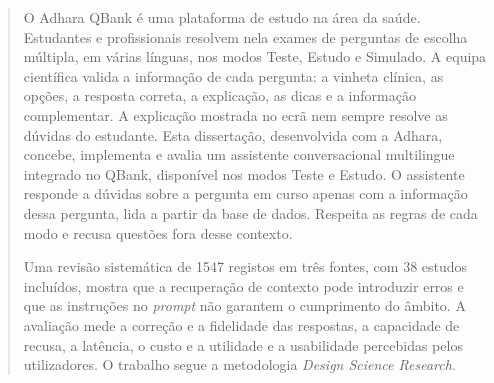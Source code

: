 \begin{abstract}



O Adhara QBank é uma plataforma de estudo na área da saúde. Estudantes e profissionais resolvem nela exames de perguntas de escolha múltipla, em várias línguas, nos modos Teste, Estudo e Simulado. A equipa científica valida a informação de cada pergunta: a vinheta clínica, as opções, a resposta correta, a explicação, as dicas e a informação complementar. A explicação mostrada no ecrã nem sempre resolve as dúvidas do estudante. Esta dissertação, desenvolvida com a Adhara, concebe, implementa e avalia um assistente conversacional multilingue integrado no QBank, disponível nos modos Teste e Estudo. O assistente responde a dúvidas sobre a pergunta em curso apenas com a informação dessa pergunta, lida a partir da base de dados. Respeita as regras de cada modo e recusa questões fora desse contexto.

Uma revisão sistemática de 1547 registos em três fontes, com 38 estudos incluídos, mostra que a recuperação de contexto pode introduzir erros e que as instruções no \emph{prompt} não garantem o cumprimento do âmbito. A avaliação mede a correção e a fidelidade das respostas, a capacidade de recusa, a latência, o custo e a utilidade e a usabilidade percebidas pelos utilizadores. O trabalho segue a metodologia \emph{Design Science Research}.


\end{abstract}

